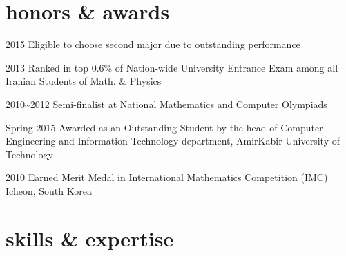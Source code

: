 \documentclass[]{friggeri-cv} %
\begin{document}

\section{honors \& awards}

\begin{entrylist}


\entry
{2015}
{{\normalfont Eligible to choose} \textcolor{TextGreen}{second major} {\normalfont due to outstanding performance}}
{}
{}


\entry
{2013}
{\normalfont Ranked in top 0.6\% of Nation-wide University Entrance Exam among all Iranian Students of Math. \& Physics}
{}
{}


\entry
{2010\textasciitilde 2012}
{\textcolor{TextOrange}{Semi-finalist} {\normalfont at National Mathematics and Computer Olympiads}}
{}
{}


\entry
{Spring 2015}
{\normalfont Awarded as an Outstanding Student by the head of Computer Engineering and Information Technology department, AmirKabir University of Technology}
{}
{}


\entry
{2010}
{{\normalfont Earned} \textcolor{Ocean}{Merit Medal} {\normalfont in International Mathematics Competition (IMC) Icheon, South Korea}}
{}
{}

\end{entrylist}


\section{skills \& expertise}
\end{document}
